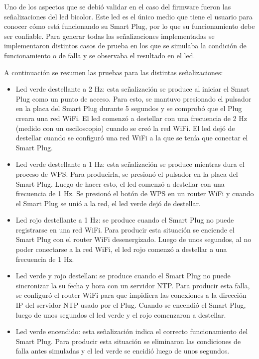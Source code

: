 Uno de los aspectos que se debió validar en el caso del firmware fueron las señalizaciones del led bicolor. Este led es el único medio que tiene el usuario para conocer cómo está funcionando su Smart Plug, por lo que su funcionamiento debe ser confiable. Para generar todas las señalizaciones implementadas se implementaron distintos casos de prueba en los que se simulaba la condición de funcionamiento o de falla y se observaba el resultado en el led.

A continuación se resumen las pruebas para las distintas señalizaciones:

\begin{itemize}
\item Led verde destellante a 2 Hz: esta señalización se produce al iniciar el Smart Plug como un punto de acceso. Para esto, se mantuvo presionado el pulsador en la placa del Smart Plug durante 5 segundos y se comprobó que el Plug creara una red WiFi. El led comenzó a destellar con una frecuencia de 2 Hz (medido con un osciloscopio) cuando se creó la red WiFi. El led dejó de destellar cuando se configuró una red WiFi a la que se tenía que conectar el Smart Plug.
\item Led verde destellante a 1 Hz: esta señalización se produce mientras dura el proceso de WPS. Para producirla, se presionó el pulsador en la placa del Smart Plug. Luego de hacer esto, el led comenzó a destellar con una frecuencia de 1 Hz. Se presionó el botón de WPS en un router WiFi y cuando el Smart Plug se unió a la red, el led verde dejó de destellar.
\item Led rojo destellante a 1 Hz: se produce cuando el Smart Plug no puede registrarse en una red WiFi. Para producir esta situación se enciende el Smart Plug con el router WiFi desenergizado. Luego de unos segundos, al no poder conectarse a la red WiFi, el led rojo comenzó a destellar a una frecuencia de 1 Hz.
\item Led verde y rojo destellan: se produce cuando el Smart Plug no puede sincronizar la su fecha y hora con un servidor NTP. Para producir esta falla, se configuró el router WiFi para que impidiera las conexiones a la dirección IP del servidor NTP usado por el Plug. Cuando se encendió el Smart Plug, luego de unos segundos el led verde y el rojo comenzaron a destellar.
\item Led verde encendido: esta señalización indica el correcto funcionamiento del Smart Plug. Para producir esta situación se eliminaron las condiciones de falla antes simuladas y el led verde se encidió luego de unos segundos.
\end{itemize}


